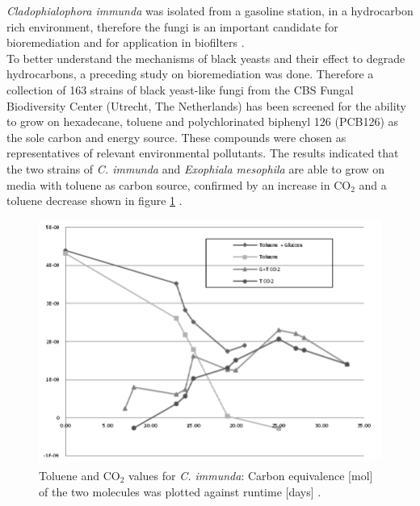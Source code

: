 \documentclass[12pt, a4paper]{report}
\begin{document}
  
\textit{Cladophialophora immunda} was isolated from a gasoline
station, in a hydrocarbon rich environment, therefore the fungi is an
important candidate for bioremediation and for application in
biofilters \cite{Prenafeta-Boldu2001}.  \\ %
To better
understand the mechanisms of black yeasts and their effect to degrade
hydrocarbons, a preceding study on bioremediation was done. Therefore
a collection of 163 strains of black yeast-like fungi from the CBS
Fungal Biodiversity Center (Utrecht, The Netherlands) has been
screened for the ability to grow on hexadecane, toluene and
polychlorinated biphenyl 126 (PCB126) as the sole carbon and energy
source. These compounds were chosen as representatives of relevant
environmental pollutants.  The results indicated that the two strains
of \textit{C. immunda} and \textit{Exophiala mesophila} are able to
grow on media with toluene as carbon source, confirmed by an increase
in CO$_2$ and a toluene decrease shown in figure \ref{GCresults}
\cite{BarbaraBlasi2015, Poyntner2014}.

\begin{figure}[H]
	\centering	
	\includegraphics[width=400pt]{pics/GCresults.png}
	\caption[Toluene and CO$_2$ values for \textit{C. immunda}]
	{Toluene and CO$_2$ values for \textit{C. immunda}: Carbon equivalence [mol] of the two molecules was plotted against runtime [days] \cite{Poyntner2014}. }
	\label{GCresults}
\end{figure}
\end{document}
